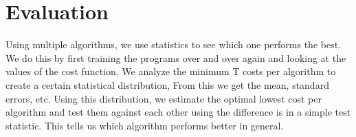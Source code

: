 \section{Evaluation}

Using multiple algorithms, we use statistics to see which one performs the best.
We do this by first training the programs over and over again and looking at the values of the cost function.
We analyze the minimum T costs per algorithm to create a certain statistical distribution,
From this we get the mean, standard errors, etc.
Using this distribution, we estimate the optimal lowest cost per algorithm and test them against each other using the difference is in a simple test statistic.
This tells us which algorithm performs better in general.
